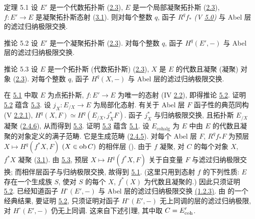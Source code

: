 \begin{enonce*}{定理 5.1}
设 $E'$ 是一个代数拓扑斯
(\hyperref[VI.def2.3]{2.3}),
$E$ 是一个局部凝聚拓扑斯
(\hyperref[VI.def2.3]{2.3}),
$f:E'\to E$ 是凝聚拓扑斯态射
(\hyperref[VI.def3.1]{3.1}).
则对每个整数 $q$, 函子 $R^qf_{\ast}$
\emph{(V \hyperref[V.subsec5.0]{5.0})}
与 Abel 层的滤过归纳极限交换.
\end{enonce*}

\begin{enonce*}{推论 5.2}
设 $E'$ 是一个凝聚拓扑斯
(\hyperref[VI.def2.3]{2.3}).
对每个整数 $q$, 函子 $H^q(E',-)$
与 Abel 层的滤过归纳极限交换.
\end{enonce*}

\begin{enonce*}{推论 5.3}
设 $E$ 是一个拓扑斯 (\resp 代数拓扑斯)
(\hyperref[VI.def2.3]{2.3}),
$X$ 是 $E$ 的代数且凝聚 (\resp 凝聚) 对象
(\hyperref[VI.def2.3]{2.3}).
对每个整数 $q$, 函子 $H^q(X,-)$
与 Abel 层的滤过归纳极限交换.
\end{enonce*}

在 \hyperref[VI.thm5.1]{5.1} 中取 $E$ 为点拓扑斯,
$f:E'\to E$ 为唯一的态射
(IV \hyperref[IV.subsec2.2]{2.2}),
即得推论 \hyperref[VI.cor5.2]{5.2}.
证明 \hyperref[VI.cor5.2]{5.2} 蕴含 \hyperref[VI.cor5.3]{5.3}.
设 $j_X:E_{/X}\to E$ 为局部化态射.
有关于 Abel 层 $F$ 函子性的典范同构
(V \hyperref[V.2.2.1]{2.2.1}),
$H^q(X,F)\simeq H^q(E_{/X},j_X^{\ast}F)$.
函子 $j_X^{\ast}$ 与归纳极限交换,
且拓扑斯 $E_{/X}$ 凝聚
(\hyperref[VI.subsubsec2.4.6]{2.4.6}),
从而得到 \hyperref[VI.cor5.3]{5.3}.
证明 \hyperref[VI.cor5.3]{5.3} 蕴含 \hyperref[VI.thm5.1]{5.1}.
设 $E_{\text{cohalg}}$ 为 $E$ 中由 $E$ 的代数且凝聚的对象定义的满子范畴.
它是生成范畴 (\hyperref[VI.subsubsec2.4.5]{2.4.5}).
对每个 Abel 层 $F$,
$R^qf_{\ast}F$ 为预层
$X\mapsto H^q(f^{\ast}X,F)$ $(X\in\operatorname{ob} C)$ 的相伴层
().
由于 $f$ 凝聚,
对 $C$ 的每个对象 $X$, $f^{\ast}X$ 凝聚
(\hyperref[VI.def3.1]{3.1}).
由 \hyperref[VI.cor5.3]{5.3},
预层 $X\mapsto H^q(f^{\ast}X,F)$
关于自变量 $F$ 与滤过归纳极限交换;
而相伴层函子与归纳极限交换, 故得到 \hyperref[VI.thm5.1]{5.1}.
(这里只用到态射 $f$ 的下列性质:
$E$ 存在一个生成族 $S$,
使对 $S$ 的每个 $X$, $f^{\ast}(X)$ 为代数且凝聚的.)
因此只须证明 \hyperref[VI.cor5.2]{5.2}.
已经知道函子 $H^{\circ}(E',-)$
与 Abel 层的滤过归纳极限交换
\hyperref[VI.thm1.23]{(1.2.3)}.
由 \cite{sga4.exp.VI.bib.7} 的一个经典结果,
要证明 \hyperref[VI.cor5.2]{5.2},
只须证明对函子 $H^{\circ}(E',-)$ 无上同调的层的滤过归纳极限,
对 $H^{\circ}(E',-)$ 仍无上同调.
这来自下述引理, 其中取 $C=E'_{\mathrm{coh}}$.

